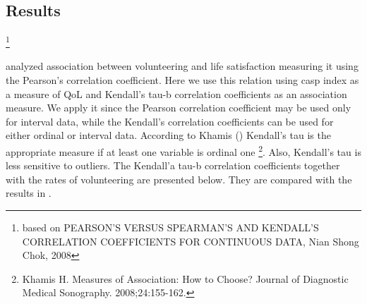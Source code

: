 \documentclass[10pt, letterpaper]{article}
\begin{document}
\begin{spacing}{1.4}
\section{Results}\footnote{based on PEARSON'S VERSUS SPEARMAN'S AND KENDALL'S CORRELATION COEFFICIENTS FOR CONTINUOUS DATA, Nian Shong Chok, 2008}

\citet{haski09} analyzed association between volunteering and life satisfaction measuring it using the Pearson's correlation coefficient. Here we use this relation  using casp index as a measure of QoL and Kendall's tau-b correlation coefficients as an association measure. We apply it since the Pearson correlation coefficient may be used only for interval data, while the Kendall's correlation coefficients can be used for either ordinal or interval data. According to Khamis ()  Kendall's tau is the appropriate measure if at least one variable is ordinal one \footnote{Khamis H. Measures of Association: How to Choose? Journal of Diagnostic Medical Sonography. 2008;24:155-162.}. Also, Kendall's tau is less sensitive to outliers. The Kendall'a tau-b correlation coefficients together with the rates of volunteering are presented below. They are compared with the results in \citet{haski09}. 



\end{spacing}
\end{document}
